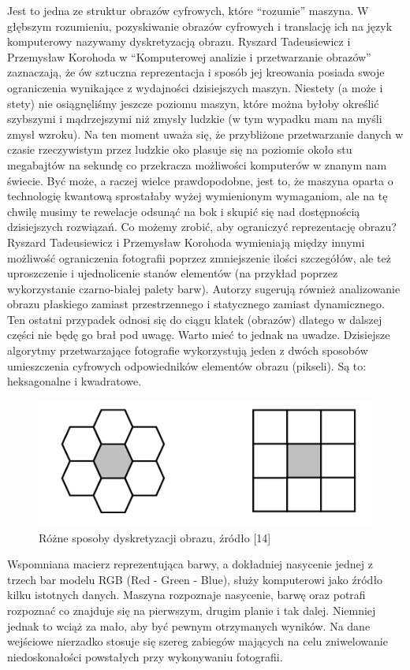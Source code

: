 \documentclass{article}
\begin{document}
	Jest to jedna ze struktur obrazów cyfrowych, które “rozumie” maszyna. W głębszym rozumieniu, pozyskiwanie obrazów cyfrowych i translację ich na język komputerowy nazywamy dyskretyzacją obrazu. Ryszard Tadeusiewicz i Przemysław Korohoda w “Komputerowej analizie i przetwarzanie obrazów” \cite{ref14} zaznaczają, że ów sztuczna reprezentacja i sposób jej kreowania posiada swoje ograniczenia wynikające z wydajności dzisiejszych maszyn. Niestety (a może i stety) nie osiągnęliśmy jeszcze poziomu maszyn, które można byłoby określić szybszymi i mądrzejszymi niż zmysły ludzkie (w tym wypadku mam na myśli zmysł wzroku). Na ten moment uważa się, że przybliżone przetwarzanie danych w czasie rzeczywistym przez ludzkie oko plasuje się na poziomie około stu megabajtów na sekundę co przekracza możliwości komputerów w znanym nam świecie. Być może, a raczej wielce prawdopodobne, jest to, że maszyna oparta o technologię kwantową sprostałaby wyżej wymienionym wymaganiom, ale na tę chwilę musimy te rewelacje odsunąć na bok i skupić się nad dostępnością dzisiejszych rozwiązań. Co możemy zrobić, aby ograniczyć reprezentację obrazu? Ryszard Tadeusiewicz i Przemysław Korohoda wymieniają między innymi możliwość ograniczenia fotografii poprzez zmniejszenie ilości szczegółów, ale też uproszczenie i ujednolicenie stanów elementów (na przykład poprzez wykorzystanie czarno-białej palety barw). Autorzy sugerują również analizowanie obrazu płaskiego zamiast przestrzennego i statycznego zamiast dynamicznego. Ten ostatni przypadek odnosi się do ciągu klatek (obrazów) dlatego w dalszej części nie będę go brał pod uwagę. Warto mieć to jednak na uwadze. Dzisiejsze algorytmy przetwarzające fotografie wykorzystują jeden z dwóch sposobów umieszczenia cyfrowych odpowiedników elementów obrazu (pikseli). Są to: heksagonalne i kwadratowe.
	\begin{figure}
		\centering
		\includegraphics[width=15cm]{dyskretyzacja}
		\caption{Różne sposoby dyskretyzacji obrazu, źródło [14]}
	\end{figure}
	Wspomniana macierz reprezentująca barwy, a dokładniej nasycenie jednej z trzech bar modelu RGB (Red - Green - Blue), służy komputerowi jako źródło kilku istotnych danych. Maszyna rozpoznaje nasycenie, barwę oraz potrafi rozpoznać co znajduje się na pierwszym, drugim planie i tak dalej. Niemniej jednak to wciąż za mało, aby być pewnym otrzymanych wyników. Na dane wejściowe nierzadko stosuje się szereg zabiegów mających na celu zniwelowanie niedoskonałości powstałych przy wykonywaniu fotografii.
\end{document}
